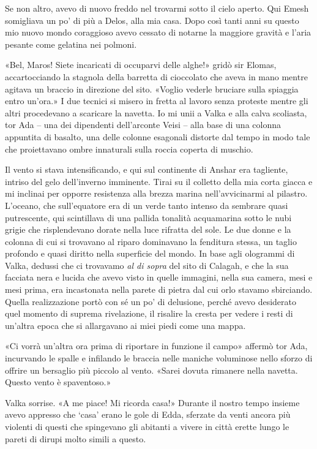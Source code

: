 Se non altro, avevo di nuovo freddo nel trovarmi sotto il cielo aperto.
Qui Emesh somigliava un po' di più a Delos, alla mia casa. Dopo così
tanti anni su questo mio nuovo mondo coraggioso avevo cessato di notarne
la maggiore gravità e l'aria pesante come gelatina nei polmoni.

«Bel, Maros! Siete incaricati di occuparvi delle alghe!» gridò sir
Elomas, accartocciando la stagnola della barretta di cioccolato che
aveva in mano mentre agitava un braccio in direzione del sito. «Voglio
vederle bruciare sulla spiaggia entro un'ora.» I due tecnici si misero
in fretta al lavoro senza proteste mentre gli altri procedevano a
scaricare la navetta. Io mi unii a Valka e alla calva scoliasta, tor Ada
-- una dei dipendenti dell'arconte Veisi -- alla base di una colonna
appuntita di basalto, una delle colonne esagonali distorte dal tempo in
modo tale che proiettavano ombre innaturali sulla roccia coperta di
muschio.

Il vento si stava intensificando, e qui sul continente di Anshar era
tagliente, intriso del gelo dell'inverno imminente. Tirai su il colletto
della mia corta giacca e mi inclinai per opporre resistenza alla brezza
marina nell'avvicinarmi al pilastro. L'oceano, che sull'equatore era di
un verde tanto intenso da sembrare quasi putrescente, qui scintillava di
una pallida tonalità acquamarina sotto le nubi grigie che risplendevano
dorate nella luce rifratta del sole. Le due donne e la colonna di cui si
trovavano al riparo dominavano la {fenditura} stessa, un taglio profondo
e quasi diritto nella superficie del mondo. In base agli ologrammi di
Valka, dedussi che ci trovavamo \emph{al di sopra} del sito di Calagah,
e che la sua facciata nera e lucida che avevo visto in quelle immagini,
nella sua camera, mesi e mesi prima, era incastonata nella parete di
pietra dal cui orlo stavamo sbirciando. Quella realizzazione portò con
sé un po' di delusione, perché avevo desiderato quel momento di suprema
rivelazione, il risalire la cresta per vedere i resti di un'altra epoca
che si allargavano ai miei piedi come una mappa.

«Ci vorrà un'altra ora prima di riportare in funzione il campo» affermò
tor Ada, incurvando le spalle e infilando le braccia nelle maniche
voluminose nello sforzo di offrire un bersaglio più piccolo al vento.
«Sarei dovuta rimanere nella navetta. Questo vento è spaventoso.»

Valka sorrise. «A me piace! Mi ricorda casa!» Durante il nostro tempo
insieme avevo appresso che `casa' erano le gole di Edda, sferzate da
venti ancora più violenti di questi che spingevano gli abitanti a vivere
in città erette lungo le pareti di dirupi molto simili a questo.

